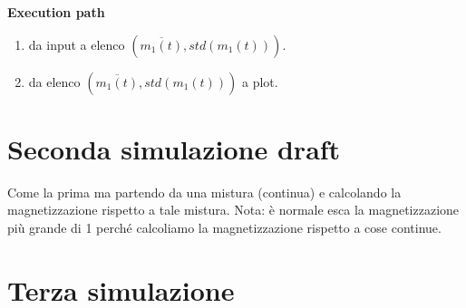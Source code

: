 \documentclass[a4paper,10pt]{article}
\begin{document}
\textbf{Execution path}
\begin{enumerate}
 \item da input a elenco $(\overline{m_1(t)}, std(m_1(t)))$.
 \item da elenco $(\overline{m_1(t)}, std(m_1(t)))$ a plot.
\end{enumerate}

\section{Seconda simulazione draft}

Come la prima ma partendo da una mistura (continua) e calcolando la magnetizzazione rispetto a tale mistura.
Nota: è normale esca la magnetizzazione più grande di 1 perché calcoliamo la magnetizzazione rispetto a cose continue.

\section{Terza simulazione}






\printbibliography
\end{document}
